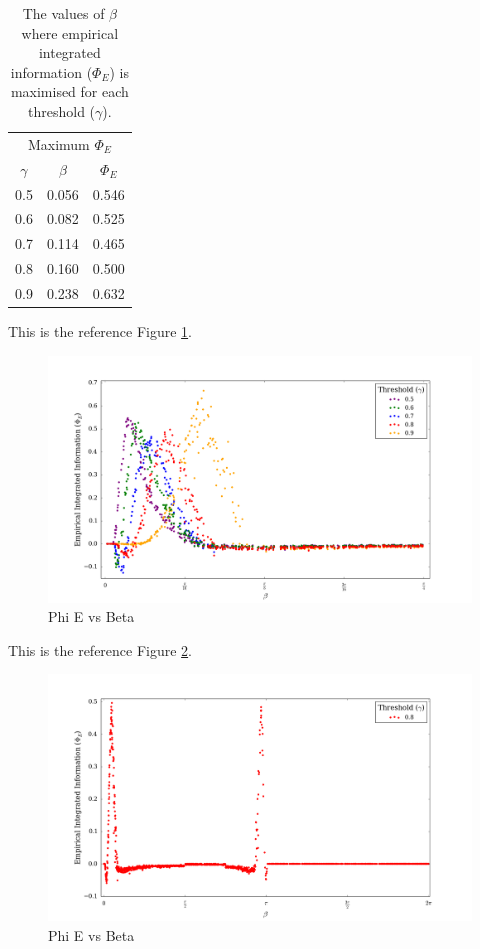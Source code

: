 \documentclass[a4paper,11pt]{article}
\begin{document}
\begin{table}[ht]
\centering
\begin{tabular}{ c | c c }
\multicolumn{3}{c}{Maximum $\Phi_E$} \\ [2mm]
$\gamma$ & $\beta$ & $\Phi_E$\\
\hline
0.5 & 0.056 & 0.546 \\
0.6 & 0.082 & 0.525 \\
0.7 & 0.114 & 0.465 \\
0.8 & 0.160 & 0.500 \\
0.9 & 0.238 & 0.632 \\
\end{tabular}
\caption{
	The values of $\beta$ where empirical integrated information ($\Phi_E$) is maximised for each threshold ($\gamma$).
	\label{tab:max-phi-beta}
}
\end{table}

This is the reference Figure \ref{fig:phi-vs-beta-orig-multi}.


\begin{figure}[H]
\begin{center}
\includegraphics[scale = 0.35]{figures/phi_vs_beta_orig_multi}
\caption{
	Phi E vs Beta
	\label{fig:phi-vs-beta-orig-multi}
}
\end{center}
\end{figure}

This is the reference Figure \ref{fig:phi-vs-beta-ext}.

\begin{figure}[H]
\begin{center}
\includegraphics[scale = 0.35]{figures/phi_vs_beta_ext}
\caption{
	Phi E vs Beta
	\label{fig:phi-vs-beta-ext}
}
\end{center}
\end{figure}
\end{document}
